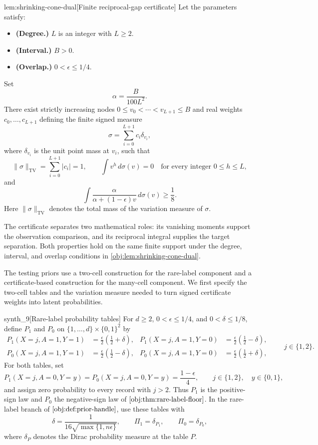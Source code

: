 \begin{lemmav}{lem:shrinking-cone-dual}[Finite reciprocal-gap certificate]
Let the parameters satisfy:
\begin{itemize}
\item \textbf{(Degree.)} \(L\) is an integer with \(L\ge 2\).
\item \textbf{(Interval.)} \(B>0\).
\item \textbf{(Overlap.)} \(0<\epsilon\le 1/4\).
\end{itemize}
Set
\[
\alpha=\frac{B}{100L^2}.
\]
There exist strictly increasing nodes \(0\le v_0<\cdots<v_{L+1}\le B\) and real weights \(c_0,\ldots,c_{L+1}\) defining the finite signed measure
\[
\sigma=\sum_{i=0}^{L+1}c_i\delta_{v_i},
\]
where \(\delta_{v_i}\) is the unit point mass at \(v_i\), such that
\[
\|\sigma\|_{\mathrm{TV}}
=\sum_{i=0}^{L+1}|c_i|=1,
\qquad
\int v^h\,d\sigma(v)=0
\quad\text{for every integer }0\le h\le L,
\]
and
\[
\int\frac{\alpha}{\alpha+(1-\epsilon)v}\,d\sigma(v)
\ge\frac18.
\]
Here \(\|\sigma\|_{\mathrm{TV}}\) denotes the total mass of the variation measure of \(\sigma\).
\end{lemmav}

The certificate separates two mathematical roles: its vanishing moments support the observation comparison, and its reciprocal integral supplies the target separation. Both properties hold on the same finite support under the degree, interval, and overlap conditions in \cref{obj:lem:shrinking-cone-dual}.

The testing priors use a two-cell construction for the rare-label component and a certificate-based construction for the many-cell component. We first specify the two-cell tables and the variation measure needed to turn signed certificate weights into latent probabilities.

\begingroup\small
\begin{definitionv}{synth_9}[Rare-label probability tables]
For \(d\ge2\), \(0<\epsilon\le1/4\), and \(0<\delta\le1/8\), define \(P_1\) and \(P_0\) on \(\{1,\ldots,d\}\times\{0,1\}^2\) by
\[
\begin{aligned}
P_1(X=j,A=1,Y=1)&=\frac{\epsilon}{2}\left(\frac12+\delta\right),&
P_1(X=j,A=1,Y=0)&=\frac{\epsilon}{2}\left(\frac12-\delta\right),\\
P_0(X=j,A=1,Y=1)&=\frac{\epsilon}{2}\left(\frac12-\delta\right),&
P_0(X=j,A=1,Y=0)&=\frac{\epsilon}{2}\left(\frac12+\delta\right),
\end{aligned}
\qquad j\in\{1,2\}.
\]
For both tables, set
\[
P_1(X=j,A=0,Y=y)=P_0(X=j,A=0,Y=y)=\frac{1-\epsilon}{4},
\qquad j\in\{1,2\},\quad y\in\{0,1\},
\]
and assign zero probability to every record with \(j>2\).
Thus \(P_1\) is the positive-sign law and \(P_0\) the negative-sign law of \(\cref{obj:thm:rare-label-floor}\). In the rare-label branch of \(\cref{obj:def:prior-handle}\), use these tables with
\[
\delta=\frac{1}{16\sqrt{\max\{1,n\epsilon\}}},
\qquad
\Pi_1=\delta_{P_1},\qquad \Pi_0=\delta_{P_0},
\]
where \(\delta_P\) denotes the Dirac probability measure at the table \(P\).
\end{definitionv}
\endgroup

